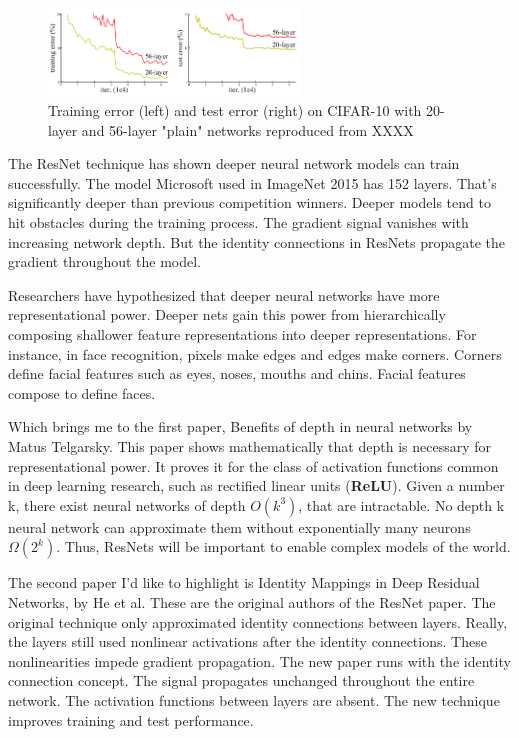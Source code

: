 \documentclass[12pt]{article}
\numberwithin{equation}{section}
\numberwithin{table}{section}
\numberwithin{figure}{section}
\begin{document}
\begin{figure}[H] \centering
	\includegraphics[width=0.6\textwidth]{image6.png}
	\caption{Training error (left) and test error (right) on CIFAR-10 with 20-layer and 56-layer "plain" networks reproduced from XXXX }
	\label{figre6}
\end{figure}


The ResNet technique has shown deeper neural network models can train successfully. The model Microsoft used in ImageNet 2015 has 152 layers. That’s significantly deeper than previous competition winners. Deeper models tend to hit obstacles during the training process. The gradient signal vanishes with increasing network depth. But the identity connections in ResNets propagate the gradient throughout the model.

Researchers have hypothesized that deeper neural networks have more representational power. Deeper nets gain this power from hierarchically composing shallower feature representations into deeper representations. For instance, in face recognition, pixels make edges and edges make corners. Corners define facial features such as eyes, noses, mouths and chins. Facial features compose to define faces.

Which brings me to the first paper, Benefits of depth in neural networks by Matus Telgarsky. This paper shows mathematically that depth is necessary for representational power. It proves it for the class of activation functions common in deep learning research, such as rectified linear units (\textbf{ReLU}). Given a number k, there exist neural networks of depth $O(k^3)$, that are intractable. No depth k neural network can approximate them without exponentially many neurons $Ω(2^k)$. Thus, ResNets will be important to enable complex models of the world.

The second paper I’d like to highlight is Identity Mappings in Deep Residual Networks, by He et al. These are the original authors of the ResNet paper. The original technique only approximated identity connections between layers. Really, the layers still used nonlinear activations after the identity connections. These nonlinearities impede gradient propagation. The new paper runs with the identity connection concept. The signal propagates unchanged throughout the entire network. The activation functions between layers are absent. The new technique improves training and test performance.
\end{document}
